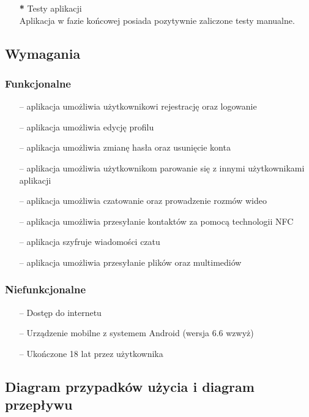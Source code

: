 \documentclass[12pt,a4paper]{article}
\begin{document}
\begin{itemize}
\item [\textbf{*}] Testy aplikacji
\\ 
\newline
Aplikacja w fazie końcowej posiada pozytywnie zaliczone testy manualne.

\end{itemize}
\subsection{Wymagania}

\subsubsection{Funkcjonalne }

\begin{itemize}\itemsep0pt
\item [--]aplikacja umożliwia użytkownikowi rejestrację oraz logowanie
\item [--]aplikacja umożliwia edycję profilu 
\item [--]aplikacja umożliwia zmianę hasła oraz usunięcie konta 
\item [--]aplikacja umożliwia użytkownikom parowanie się z innymi użytkownikami aplikacji 
\item [--]aplikacja umożliwia czatowanie oraz prowadzenie rozmów wideo 
\item [--]aplikacja umożliwia przesyłanie kontaktów za pomocą technologii NFC
\item [--]aplikacja szyfruje wiadomości czatu
\item [--]aplikacja umożliwia przesyłanie plików oraz multimediów
\end{itemize}

\subsubsection{Niefunkcjonalne}

\begin{itemize}\itemsep0pt
\item [--] Dostęp do internetu
\item [--] Urządzenie mobilne z systemem Android  (wersja 6.6 wzwyż)

\item [--] Ukończone 18 lat przez użytkownika
\end{itemize}

\newpage
\subsection{Diagram przypadków użycia i diagram przepływu}
\end{document}
